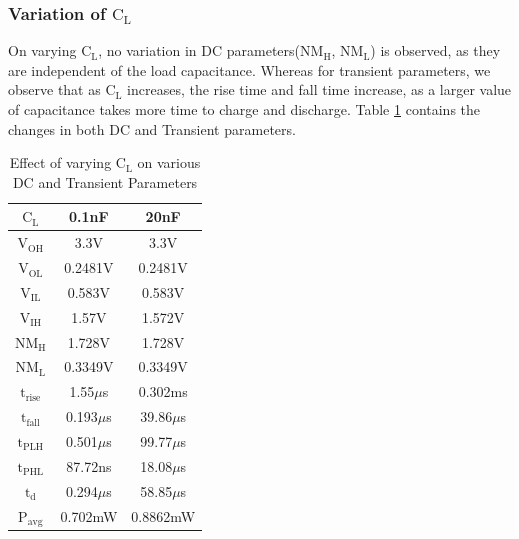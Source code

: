 \documentclass[12pt, a4paper]{article}
\begin{document}
	\subsubsection{Variation of $\text{C}_\text{L}$}
	On varying $\text{C}_\text{L}$, no variation in DC parameters($\text{NM}_\text{H}$, $\text{NM}_\text{L}$) is observed, as they are independent of the load capacitance. Whereas for transient parameters, we observe that as $\text{C}_\text{L}$ increases, the rise time and fall time increase, as a larger value of capacitance takes more time to charge and discharge. Table \ref{table::tablevarcl} contains the changes in both DC and Transient parameters.
	\begin{table}[H]
		\begin{center}
			\begin{tabular}{|c|c|c|}
				\hline 
				\rule[-1ex]{0pt}{2.5ex} $\text{C}_\text{L}$ & 0.1nF & 20nF\\ 
				\hline 
				\rule[-1ex]{0pt}{2.5ex} 
				$\text{V}_\text{OH}$ & 3.3V & 3.3V  \\ 
				$\text{V}_\text{OL}$ & 0.2481V & 0.2481V \\ 
				$\text{V}_\text{IL}$ & 0.583V & 0.583V \\ 
				$\text{V}_\text{IH}$ & 1.57V & 1.572V \\ 
				$\text{NM}_\text{H}$ & 1.728V & 1.728V\\ 
				$\text{NM}_\text{L}$ & 0.3349V & 0.3349V \\ 
				$\text{t}_\text{rise}$ & 1.55$\mu$s & 0.302ms\\ 
				$\text{t}_\text{fall}$ & 0.193$\mu$s & 39.86$\mu$s\\ 
				$\text{t}_\text{PLH}$ & 0.501$\mu$s & 99.77$\mu$s\\ 
				$\text{t}_\text{PHL}$ & 87.72ns & 18.08$\mu$s\\ 
				$\text{t}_\text{d}$ & 0.294$\mu$s & 58.85$\mu$s\\ 
				$\text{P}_\text{avg}$ & 0.702mW  & 0.8862mW\\ 
				\hline 
			\end{tabular} 
		\end{center}
		\caption{Effect of varying $\text{C}_\text{L}$ on various DC and Transient Parameters}
		\label{table::tablevarcl}
	\end{table}
\end{document}
